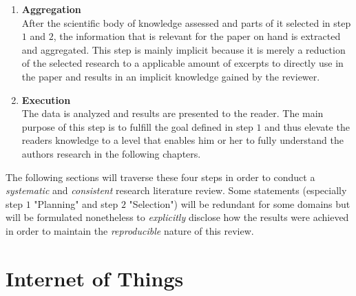 \begin{enumerate}
    \item
    \textbf{Aggregation}\\
    After the scientific body of knowledge assessed and parts of it selected in step $1$ and $2$, the information that is relevant for the paper on hand is extracted and aggregated. This step is mainly implicit because it is merely a reduction of the selected research to a applicable amount of excerpts to directly use in the paper and results in an implicit knowledge gained by the reviewer.
    \item
    \textbf{Execution}\\
    The data is analyzed and results are presented to the reader. The main purpose of this step is to fulfill the goal defined in step $1$ and thus elevate the readers knowledge to a level that enables him or her to fully understand the authors research in the following chapters.
\end{enumerate}

The following sections will traverse these four steps in order to conduct a \textit{systematic} and \textit{consistent} research literature review. Some statements (especially step $1$ "Planning" and step $2$ "Selection") will be redundant for some domains but will be formulated nonetheless to \textit{explicitly} disclose how the results were achieved in order to maintain the \textit{reproducible} nature of this review.


\section{Internet of Things}

